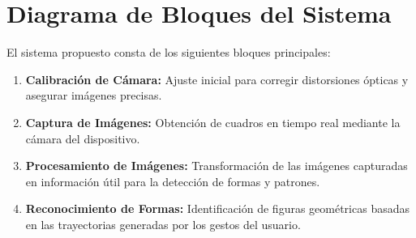 \section{Diagrama de Bloques del Sistema}
El sistema propuesto consta de los siguientes bloques principales:
\begin{enumerate}
    \item \textbf{Calibración de Cámara:} Ajuste inicial para corregir distorsiones ópticas y asegurar imágenes precisas.
    \item \textbf{Captura de Imágenes:} Obtención de cuadros en tiempo real mediante la cámara del dispositivo.
    \item \textbf{Procesamiento de Imágenes:} Transformación de las imágenes capturadas en información útil para la detección de formas y patrones.
    \item \textbf{Reconocimiento de Formas:} Identificación de figuras geométricas basadas en las trayectorias generadas por los gestos del usuario.


\end{enumerate}
